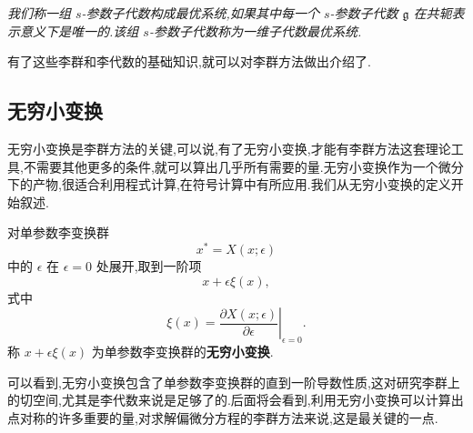 \begin{definition}[一维子代数最优系统]
    \emph{我们称一组 $s$-参数子代数构成最优系统,如果其中每一个 $s$-参数子代数 $\mathfrak{g}$ 在共轭表示意义下是唯一的.该组 $s$-参数子代数称为一维子代数最优系统.}
\end{definition}

有了这些李群和李代数的基础知识,就可以对李群方法做出介绍了.

\subsection{无穷小变换}
无穷小变换是李群方法的关键,可以说,有了无穷小变换,才能有李群方法这套理论工具,不需要其他更多的条件,就可以算出几乎所有需要的量.无穷小变换作为一个微分下的产物,很适合利用程式计算,在符号计算中有所应用.我们从无穷小变换的定义开始叙述.


对单参数李变换群
\begin{equation}\label{eq:liet}
x^{*}=X(x;\epsilon)
\end{equation}
中的 $\epsilon$ 在 $\epsilon=0$ 处展开,取到一阶项
\begin{equation*}
x+\epsilon \xi(x),
\end{equation*}
式中
\begin{equation*}
\xi(x)=\left.\frac{\partial X(x;\epsilon)}{\partial \epsilon}\right|_{\epsilon=0}.
\end{equation*}
称 $x+\epsilon \xi(x)$ 为单参数李变换群的\textbf{无穷小变换}.

可以看到,无穷小变换包含了单参数李变换群的直到一阶导数性质,这对研究李群上的切空间,尤其是李代数来说是足够了的.后面将会看到,利用无穷小变换可以计算出点对称的许多重要的量,对求解偏微分方程的李群方法来说,这是最关键的一点.

